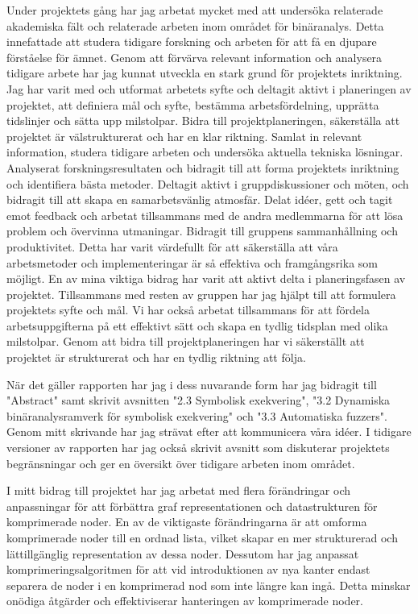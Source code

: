 
Under projektets gång har jag arbetat mycket med att undersöka relaterade akademiska fält och relaterade arbeten inom området för binäranalys.
Detta innefattade att studera tidigare forskning och arbeten för att få en djupare förståelse för ämnet. Genom att förvärva relevant information
och analysera tidigare arbete har jag kunnat utveckla en stark grund för projektets inriktning. Jag har varit med och utformat arbetets syfte och
deltagit aktivt i planeringen av projektet, att definiera mål och syfte, bestämma arbetsfördelning, upprätta tidslinjer och sätta upp milstolpar.
Bidra till projektplaneringen, säkerställa att projektet är välstrukturerat och har en klar riktning. Samlat in relevant information, studera
tidigare arbeten och undersöka aktuella tekniska lösningar. Analyserat forskningsresultaten och bidragit till att forma projektets inriktning och
identifiera bästa metoder. Deltagit aktivt i gruppdiskussioner och möten, och bidragit till att skapa en samarbetsvänlig atmosfär. Delat idéer,
gett och tagit emot feedback och arbetat tillsammans med de andra medlemmarna för att lösa problem och övervinna utmaningar. Bidragit till gruppens
sammanhållning och produktivitet. Detta har varit värdefullt för att säkerställa att våra arbetsmetoder och implementeringar är så effektiva och
framgångsrika som möjligt. En av mina viktiga bidrag har varit att aktivt delta i planeringsfasen av projektet. Tillsammans med resten av gruppen
har jag hjälpt till att formulera projektets syfte och mål. Vi har också arbetat tillsammans för att fördela arbetsuppgifterna på ett effektivt sätt
och skapa en tydlig tidsplan med olika milstolpar. Genom att bidra till projektplaneringen har vi säkerställt att projektet är
strukturerat och har en tydlig riktning att följa.

När det gäller rapporten har jag i dess nuvarande form har jag bidragit till "Abstract" samt skrivit avsnitten "2.3 Symbolisk exekvering",
"3.2 Dynamiska binäranalysramverk för symbolisk exekvering" och "3.3 Automatiska fuzzers". Genom mitt skrivande har jag strävat efter att
kommunicera våra idéer. I tidigare versioner av rapporten har jag också skrivit avsnitt som diskuterar projektets begränsningar och ger
en översikt över tidigare arbeten inom området.

I mitt bidrag till projektet har jag arbetat med flera förändringar och anpassningar för att förbättra graf
representationen och datastrukturen för komprimerade noder. En av de viktigaste förändringarna är att omforma
komprimerade noder till en ordnad lista, vilket skapar en mer strukturerad och lättillgänglig representation av dessa noder.
Dessutom har jag anpassat komprimeringsalgoritmen för att vid introduktionen av nya kanter endast separera de noder
i en komprimerad nod som inte längre kan ingå. Detta minskar onödiga åtgärder och effektiviserar hanteringen av
komprimerade noder.

